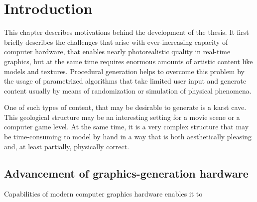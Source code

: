 \chapter{Introduction}

This chapter describes motivations behind the development of the thesis. It 
first briefly describes the challenges that arise with ever-increasing capacity 
of computer hardware, that enables nearly photorealistic quality in real-time graphics, but
at the same time requires enormous amounts of artistic content like models and textures. Procedural 
generation helps to overcome this problem by the usage of parametrized
algorithms that take limited user input and generate content usually by means
of randomization or simulation of physical phenomena.

One of such types of content, that may be desirable to generate is a karst cave.
This geological structure may be an interesting setting for a movie scene or a
computer game level. At the same time, it is a very complex structure
that may be time-consuming to model by hand in a way that is both aesthetically
pleasing and, at least partially, physically correct.

\section{Advancement of graphics-generation hardware}

Capabilities of modern computer graphics hardware enables it to  
